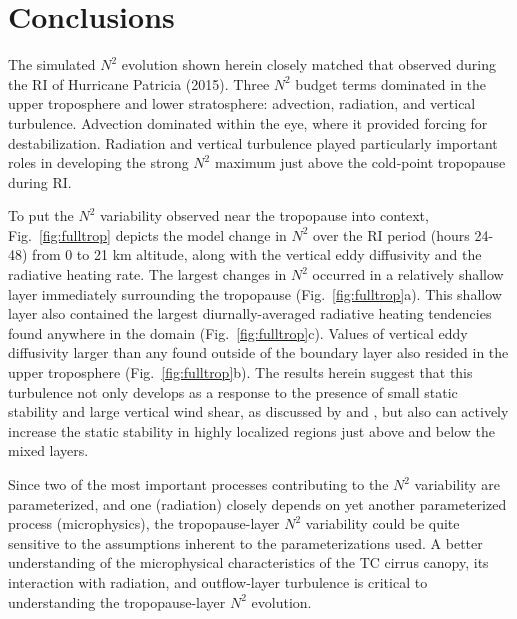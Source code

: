  \section{Conclusions}
The simulated $N^2$ evolution shown herein closely matched that observed during the RI of Hurricane Patricia (2015).
Three $N^2$ budget terms dominated in the upper troposphere and lower stratosphere: advection, radiation, and vertical turbulence.
Advection dominated within the eye, where it provided forcing for destabilization.
Radiation and vertical turbulence played particularly important roles in developing the strong $N^2$ maximum just above the cold-point tropopause during RI.

To put the $N^2$ variability observed near the tropopause into context, Fig.~\ref{fig:fulltrop} depicts the model change in $N^2$ over the RI period (hours 24-48) from 0 to 21 km altitude, along with the vertical eddy diffusivity and the radiative heating rate.
The largest changes in $N^2$ occurred in a relatively shallow layer immediately surrounding the tropopause (Fig.~\ref{fig:fulltrop}a).
This shallow layer also contained the largest diurnally-averaged radiative heating tendencies found anywhere in the domain (Fig.~\ref{fig:fulltrop}c).
Values of vertical eddy diffusivity larger than any found outside of the boundary layer also resided in the upper troposphere (Fig.~\ref{fig:fulltrop}b).
The results herein suggest that this turbulence not only develops as a response to the presence of small static stability and large vertical wind shear, as discussed by \cite{Molinarietal2014} and \cite{DuranMolinari2016}, but also can actively increase the static stability in highly localized regions just above and below the mixed layers.

Since two of the most important processes contributing to the $N^2$ variability are parameterized, and one (radiation) closely depends on yet another parameterized process (microphysics), the tropopause-layer $N^2$ variability could be quite sensitive to the assumptions inherent to the parameterizations used.
A better understanding of the microphysical characteristics of the TC cirrus canopy, its interaction with radiation, and outflow-layer turbulence is critical to understanding the tropopause-layer $N^2$ evolution.

